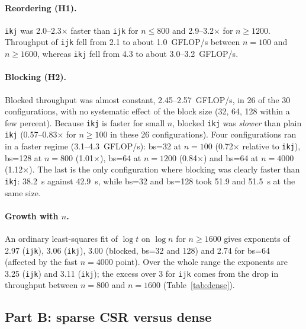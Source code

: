 \documentclass[11pt,a4paper]{article}
\begin{document}
\paragraph{Reordering (H1).} \texttt{ikj} was 2.0--2.3$\times$ faster than \texttt{ijk} for $n\le 800$ and 2.9--3.2$\times$ for $n\ge 1200$. Throughput of \texttt{ijk} fell from 2.1 to about 1.0~GFLOP/s between $n=100$ and $n\ge1600$, whereas \texttt{ikj} fell from 4.3 to about 3.0--3.2~GFLOP/s.
\paragraph{Blocking (H2).} Blocked throughput was almost constant, 2.45--2.57~GFLOP/s, in 26 of the 30 configurations, with no systematic effect of the block size (32, 64, 128 within a few percent). Because \texttt{ikj} is faster for small $n$, blocked \texttt{ikj} was \emph{slower} than plain \texttt{ikj} (0.57--0.83$\times$ for $n\ge 100$ in these 26 configurations). Four configurations ran in a faster regime (3.1--4.3~GFLOP/s): bs=32 at $n=100$ (0.72$\times$ relative to \texttt{ikj}), bs=128 at $n=800$ (1.01$\times$), bs=64 at $n=1200$ (0.84$\times$) and bs=64 at $n=4000$ (1.12$\times$). The last is the only configuration where blocking was clearly faster than \texttt{ikj}: 38.2~s against 42.9~s, while bs=32 and bs=128 took 51.9 and 51.5~s at the same size.
\paragraph{Growth with $n$.} An ordinary least-squares fit of $\log t$ on $\log n$ for $n\ge1600$ gives exponents of 2.97 (\texttt{ijk}), 3.06 (\texttt{ikj}), 3.00 (blocked, bs=32 and 128) and 2.74 for bs=64 (affected by the fast $n=4000$ point). Over the whole range the exponents are 3.25 (\texttt{ijk}) and 3.11 (\texttt{ikj}); the excess over 3 for \texttt{ijk} comes from the drop in throughput between $n=800$ and $n=1600$ (Table~\ref{tab:dense}).

\subsection{Part B: sparse CSR versus dense}
\begin{table}[t]\centering\footnotesize
\caption{Sparse versus dense (median time in seconds). $S_\text{mul}$ and $S_\text{e2e}$: time of dense \texttt{ikj} divided by the CSR kernel time and by the CSR end-to-end time (conversion included). Sparsity in \%; nnz are realised counts; ``dens.\ $C$'' = density of $C$ in \%.}\label{tab:sparse}
\setlength{\tabcolsep}{3.2pt}
\end{table}
\end{document}
